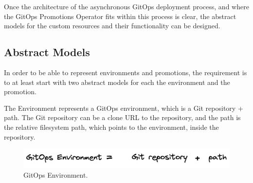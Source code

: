%
%
%

Once the architecture of the asynchronous GitOps deployment process,
and where the GitOps Promotions Operator fits within this process is clear,
the abstract models for the custom resources and their functionality can be designed.

\subsection{Abstract Models}
	
In order to be able to represent environments and promotions,
the requirement is to at least start with two abstract models for each 
the environment and the promotion.

The Environment represents a GitOps environment,
which is a Git repository + path.
The Git repository can be a clone URL to the repository,
and the path is the relative filesystem path, which points to the 
environment, inside the repository.

\begin{figure}[h]
	\centering
	\includegraphics[width=1.00\linewidth]{assets/gitops-env-repo-and-path.png}
	\caption{GitOps Environment.
	}
	\label{fig:gitops-env-repo-and-path}	
\end{figure}

